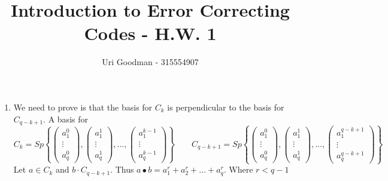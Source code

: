 \documentclass{article}
\author{Uri Goodman - 315554907}
\title{Introduction to Error Correcting Codes - H.W. 1}
\begin{document}
    \maketitle
    \begin{enumerate}
        \item We need to prove is that the basis for $C_k$  is perpendicular to the basis for $C_{q-k+1}$. A basis for \[C_k = Sp\left\{ \begin{pmatrix} a_1 ^0\\\vdots\\a_q ^0\end{pmatrix},\begin{pmatrix}
                a_1 ^1\\\vdots\\a_q ^1
            \end{pmatrix},\dots,\begin{pmatrix}
                a_1 ^{k-1}\\\vdots\\a_q ^{k-1}
            \end{pmatrix}\right\}\qquad C_{q-k+1} = Sp\left\{ \begin{pmatrix} a_1 ^0\\\vdots\\a_q ^0\end{pmatrix},\begin{pmatrix}
                a_1 ^1\\\vdots\\a_q ^1
            \end{pmatrix},\dots,\begin{pmatrix}
                a_1 ^{q-k+1}\\\vdots\\a_q ^{q-k+1}
        \end{pmatrix}\right\}\] Let $ a \in C_k$ and  $b\cdot C_{q-k+1}$. Thus $a\bullet b = a_1 ^r +a_2 ^r + \dots +a_q ^r$. Where $r < q-1$
\end{enumerate}
\end{document}
